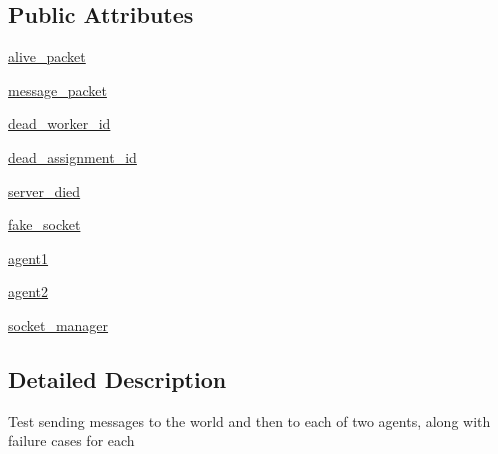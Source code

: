 \subsection*{Public Attributes}
\begin{DoxyCompactItemize}
\item 
\hyperlink{classparlai_1_1mturk_1_1core_1_1dev_1_1test_1_1test__socket__manager_1_1TestSocketManagerMessageHandling_a50921bd46b7a75539519abdec05b272d}{alive\+\_\+packet}
\item 
\hyperlink{classparlai_1_1mturk_1_1core_1_1dev_1_1test_1_1test__socket__manager_1_1TestSocketManagerMessageHandling_ada834531ef21ca05a61d4742d03795f4}{message\+\_\+packet}
\item 
\hyperlink{classparlai_1_1mturk_1_1core_1_1dev_1_1test_1_1test__socket__manager_1_1TestSocketManagerMessageHandling_aa580dd35ffd8cb2347bf7ca777fe6f0b}{dead\+\_\+worker\+\_\+id}
\item 
\hyperlink{classparlai_1_1mturk_1_1core_1_1dev_1_1test_1_1test__socket__manager_1_1TestSocketManagerMessageHandling_afa362bc16ba31c2b65e4e1d205edaba9}{dead\+\_\+assignment\+\_\+id}
\item 
\hyperlink{classparlai_1_1mturk_1_1core_1_1dev_1_1test_1_1test__socket__manager_1_1TestSocketManagerMessageHandling_a0580eca17e4f94732f6c2ef435c0b51f}{server\+\_\+died}
\item 
\hyperlink{classparlai_1_1mturk_1_1core_1_1dev_1_1test_1_1test__socket__manager_1_1TestSocketManagerMessageHandling_a0041fd7fb83462822fc3b24f0347f35a}{fake\+\_\+socket}
\item 
\hyperlink{classparlai_1_1mturk_1_1core_1_1dev_1_1test_1_1test__socket__manager_1_1TestSocketManagerMessageHandling_a9c9d98057f1a20cff25bea106edcddb6}{agent1}
\item 
\hyperlink{classparlai_1_1mturk_1_1core_1_1dev_1_1test_1_1test__socket__manager_1_1TestSocketManagerMessageHandling_a5499674a391613c550e6b951b068a4b1}{agent2}
\item 
\hyperlink{classparlai_1_1mturk_1_1core_1_1dev_1_1test_1_1test__socket__manager_1_1TestSocketManagerMessageHandling_ac83ba21d89c971b4419daca7382cacbe}{socket\+\_\+manager}
\end{DoxyCompactItemize}


\subsection{Detailed Description}
\begin{DoxyVerb}Test sending messages to the world and then to each of two agents,
along with failure cases for each
\end{DoxyVerb}
 

